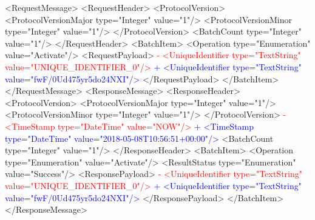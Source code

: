  \newpage
 <RequestMessage>
   <RequestHeader>
     <ProtocolVersion>
       <ProtocolVersionMajor type="Integer" value="1"/>
       <ProtocolVersionMinor type="Integer" value="1"/>
     </ProtocolVersion>
     <BatchCount type="Integer" value="1"/>
   </RequestHeader>
   <BatchItem>
     <Operation type="Enumeration" value="Activate"/>
     <RequestPayload>
\textcolor{red}{-      <UniqueIdentifier type="TextString" value="UNIQUE_IDENTIFIER_0"/>}
\textcolor{blue}{+      <UniqueIdentifier type="TextString" value="fwF/0Ud475yr5do24NXI"/>}
     </RequestPayload>
   </BatchItem>
 </RequestMessage>
 <ResponseMessage>
   <ResponseHeader>
     <ProtocolVersion>
       <ProtocolVersionMajor type="Integer" value="1"/>
       <ProtocolVersionMinor type="Integer" value="1"/>
     </ProtocolVersion>
\textcolor{red}{-    <TimeStamp type="DateTime" value="NOW"/>}
\textcolor{blue}{+    <TimeStamp type="DateTime" value="2018-05-08T10:56:51+00:00"/>}
     <BatchCount type="Integer" value="1"/>
   </ResponseHeader>
   <BatchItem>
     <Operation type="Enumeration" value="Activate"/>
     <ResultStatus type="Enumeration" value="Success"/>
     <ResponsePayload>
\textcolor{red}{-      <UniqueIdentifier type="TextString" value="UNIQUE_IDENTIFIER_0"/>}
\textcolor{blue}{+      <UniqueIdentifier type="TextString" value="fwF/0Ud475yr5do24NXI"/>}
     </ResponsePayload>
   </BatchItem>
 </ResponseMessage>
 
